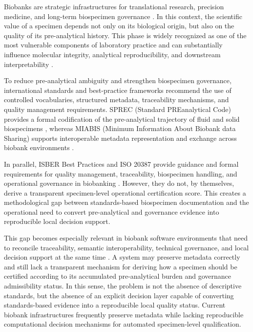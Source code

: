 \documentclass[preprint,12pt]{elsarticle}
\begin{document}
Biobanks are strategic infrastructures for translational research, precision medicine, and long-term biospecimen 
governance \cite{malsagova2020,muller2020}. In this context, the scientific value of a specimen depends not only on 
its biological origin, but also on the quality of its pre-analytical history. This phase is widely recognized as one 
of the most vulnerable components of laboratory practice and can substantially influence molecular integrity, 
analytical reproducibility, and downstream interpretability \cite{plebani2006,campbell2018}.

To reduce pre-analytical ambiguity and strengthen biospecimen governance, international standards and best-practice 
frameworks recommend the use of controlled vocabularies, structured metadata, traceability mechanisms, and quality 
management requirements. SPREC (Standard PREanalytical Code) provides a formal codification of the pre-analytical 
trajectory of fluid and solid biospecimens \cite{betsou2010,lehmann2012}, whereas MIABIS (Minimum Information About 
Biobank data Sharing) supports interoperable metadata representation and exchange across biobank environments 
\cite{norlin2012,merinomartinez2016}. 

In parallel, ISBER Best Practices and ISO 20387 provide guidance and formal requirements for quality management, traceability, biospecimen 
handling, and operational governance in biobanking \cite{campbell2018,iso20387}. However, they do not, by themselves, derive a transparent 
specimen-level operational certification score. This creates a methodological gap between standards-based biospecimen documentation and the 
operational need to convert pre-analytical and governance evidence into reproducible local decision support.

This gap becomes especially relevant in biobank software environments that need to reconcile traceability, semantic interoperability, technical 
governance, and local decision support at the same time \cite{norlin2012,merinomartinez2016,campbell2018,iso20387}. A system may preserve metadata 
correctly and still lack a transparent mechanism for deriving how a specimen should be certified according to its accumulated pre-analytical 
burden and governance admissibility status. In this sense, the problem is not the absence of descriptive standards, but the absence of an explicit 
decision layer capable of converting standards-based evidence into a reproducible local quality status. Current biobank infrastructures frequently 
preserve metadata while lacking reproducible computational decision mechanisms for automated specimen-level qualification.
\end{document}
